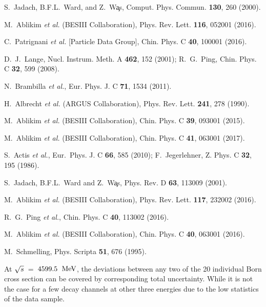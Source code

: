 \begin{thebibliography}{99}
S.~Jadach, B.F.L.~Ward, and Z.~W\c{a}s, Comput. Phys. Commun. {\bf 130}, 260 (2000).

M.~Ablikim {\it et al.}  (BESIII Collaboration), Phys. Rev. Lett. {\bf 116}, 052001 (2016).

C.~Patrignani {\it et al.} [Particle Data Group], Chin. Phys. C {\bf 40}, 100001 (2016).

D.~J.~Lange, Nucl. Instrum. Meth. A {\bf 462}, 152 (2001); R.~G.~Ping, Chin. Phys. C {\bf 32}, 599 (2008).

N.~Brambilla {\it et al.}, Eur. Phys. J. C {\bf 71}, 1534 (2011).

H.~Albrecht {\it et al.} (ARGUS Collaboration), Phys. Rev. Lett. {\bf 241}, 278 (1990).

M.~Ablikim {\it et al.} (BESIII Collaboration), Chin. Phys. C {\bf 39}, 093001 (2015).

M.~Ablikim {\it et al.} (BESIII Collaboration), Chin. Phys. C {\bf 41}, 063001 (2017).

S.~Actis {\it et al.}, Eur.~Phys. J. C {\bf 66}, 585 (2010); F.~Jegerlehner, Z. Phys. C {\bf 32}, 195 (1986).

S.~Jadach, B.F.L.~Ward and Z.~W\c{a}s,  Phys. Rev. D {\bf 63}, 113009 (2001).

M.~Ablikim {\it et al.}  (BESIII Collaboration), Phys. Rev. Lett. {\bf 117}, 232002 (2016).

R.~G.~Ping {\it et al.}, Chin. Phys. C {\bf 40}, 113002 (2016).

M.~Ablikim {\it et al.} (BESIII Collaboration), Chin. Phys. C {\bf 40}, 063001 (2016).

M.~Schmelling, Phys. Scripta {\bf 51}, 676 (1995).

At $\sqrt{s}$~=~$4599.5$~$\mathrm{MeV}$, the deviations between any two of the 20 individual Born cross section can be covered by corresponding total uncertainty. While it is not the case for a few decay channels at other three energies due to the low statistics of the data sample.
\end{thebibliography}
